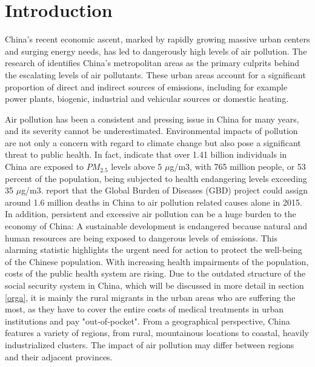 \documentclass[
]{article}
\begin{document}
	\newpage
	
	\hypertarget{introduction}{%
		\section{Introduction}\label{introduction}}
	China's recent economic ascent, marked by rapidly growing massive urban centers and surging energy needs, has led to dangerously high levels of air pollution. The research of \cite{chan2008air} identifies China's metropolitan areas as the primary culprits behind the escalating levels of air pollutants. These urban areas account for a significant proportion of direct and indirect sources of emissions, including for example power plants, biogenic, industrial and vehicular sources or domestic heating. 

	Air pollution has been a consistent and pressing issue in China for many years, and its severity cannot be underestimated. Environmental impacts of pollution are not only a concern with regard to climate change but also pose a significant threat to public health. In fact, \cite{maruyama2022air} indicate that over 1.41 billion individuals in China are exposed to $PM_{2.5}$ levels above 5 $\mu$g/m3, with 765 million people, or 53 percent of the population, being subjected to health endangering levels exceeding 35 $\mu$g/m3.
	\cite{song_air_2017} report that the Global Burden of Diseases (GBD) project could assign around 1.6 million deaths in China to air pollution related causes alone in 2015. In addition, persistent and excessive air pollution can be a huge burden to the economy of China: A sustainable development is endangered because natural and human resources are being exposed to dangerous levels of  emissions. This alarming statistic highlights the urgent need for action to protect the well-being of the Chinese population. With increasing health impairments of the population, costs of the public health system are rising. 
	Due to the outdated structure of the social security system in China, which will be discussed in more detail in section \ref{orga}, it is mainly the rural migrants in the urban areas who are suffering the most, as they have to cover the entire costs of medical treatments in urban institutions and pay "out-of-pocket". 
	From a geographical perspective, China features a variety of regions, from rural, mountainous locations to coastal, heavily industrialized clusters. The impact of air pollution may differ between regions and their adjacent provinces.\\ 
\end{document}
